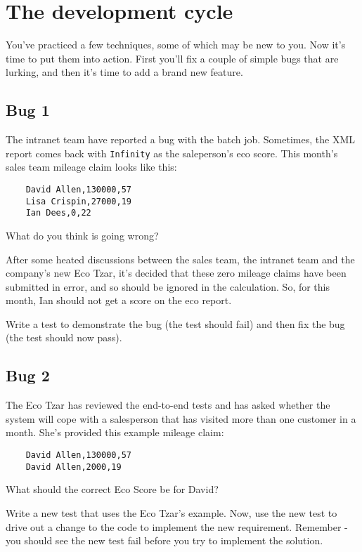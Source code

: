 \chapter*{The development cycle}

You've practiced a few techniques, some of which may be new to you. Now it's time to put them into action. First you'll fix a couple of simple bugs that are lurking, and then it's time to add a brand new feature.


\section*{Bug 1}

The intranet team have reported a bug with the batch job. Sometimes, the XML report comes back with \texttt{Infinity} as the saleperson's eco score. This month's sales team mileage claim looks like this:

\begin{verbatim}
    David Allen,130000,57
    Lisa Crispin,27000,19
    Ian Dees,0,22
\end{verbatim}

What do you think is going wrong?


After some heated discussions between the sales team, the intranet team and the company's new Eco Tzar, it's decided that these zero mileage claims have been submitted in error, and so should be ignored in the calculation. So, for this month, Ian should not get a score on the eco report. 

Write a test to demonstrate the bug (the test should fail) and then fix the bug (the test should now pass).

\section*{Bug 2}

The Eco Tzar has reviewed the end-to-end tests and has asked whether the system will cope with a salesperson that has visited more than one customer in a month. She's provided this example mileage claim:

\begin{verbatim}
    David Allen,130000,57
    David Allen,2000,19
\end{verbatim}

What should the correct Eco Score be for David?

Write a new test that uses the Eco Tzar's example. Now, use the new test to drive out a change to the code to implement the new requirement. Remember - you should see the new test fail before you try to implement the solution.

